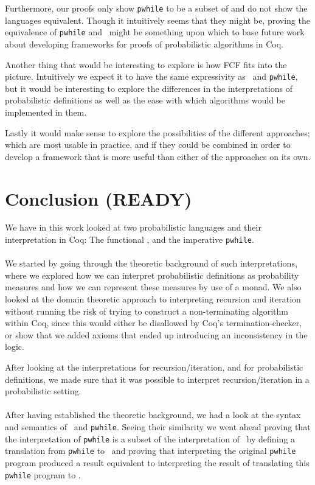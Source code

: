 \documentclass[11pt, leqno, titlepage]{article}
\theoremstyle{definition}
\begin{document}
Furthermore, our proofs only show \texttt{pwhile} to be a subset of \rml and do not
show the languages equivalent. Though it intuitively seems that they might be,
proving the equivalence of \texttt{pwhile} and \rml\ might be something upon which to
base future work about developing frameworks for proofs of probabilistic algorithms
in Coq.

Another thing that would be interesting to explore is how FCF fits into the
picture. Intuitively we expect it to have the same expressivity as \rml\ and
\texttt{pwhile}, but it would be interesting to explore the differences in the
interpretations of probabilistic definitions as well as the ease with which algorithms
would be implemented in them.

Lastly it would make sense to explore the possibilities of the different approaches;
which are most usable in practice, and if they could be combined in order to develop
a framework that is more useful than either of the approaches on its own. 

\section{Conclusion (READY)}
\label{sec:conclusion}
We have in this work looked at two probabilistic languages and their interpretation
in Coq: The functional \rml, and the imperative \texttt{pwhile}.\\
\\
We started by going through the theoretic background of such interpretations, where
we explored how we can interpret probabilistic definitions as probability measures
and how we can represent these measures by use of a monad. We also looked at the
domain theoretic approach to interpreting recursion and iteration without running the
risk of trying to construct a non-terminating algorithm within Coq, since this would
either be disallowed by Coq's termination-checker, or show that we added axioms
that ended up introducing an inconsistency in the logic.

After looking at the interpretations for recursion/iteration, and for probabilistic
definitions, we made sure that it was possible to interpret recursion/iteration in a
probabilistic setting.\\
\\
After having established the theoretic background, we had a look at the syntax and
semantics of \rml\ and \texttt{pwhile}. Seeing their similarity we went ahead proving
that the interpretation of \texttt{pwhile} is a subset of the interpretation of
\rml\ by defining a translation from \texttt{pwhile} to \rml\ and proving that
interpreting the original \texttt{pwhile} program produced a result equivalent to
interpreting the result of translating this \texttt{pwhile} program to \rml.
\end{document}
